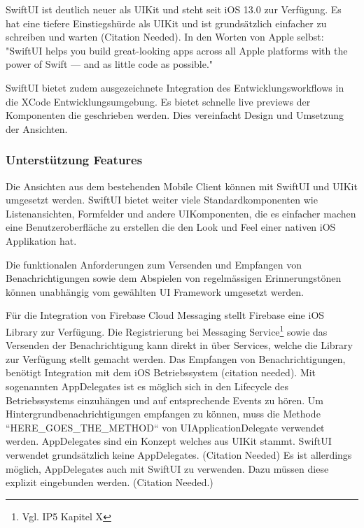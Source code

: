 SwiftUI ist deutlich neuer als UIKit und steht seit iOS 13.0 zur Verfügung.
Es hat eine tiefere Einstiegshürde als UIKit und ist grundsätzlich einfacher zu schreiben und warten (Citation Needed).
In den Worten von Apple selbst: "SwiftUI helps you build great-looking apps across all Apple platforms with the power of Swift — and as little code as possible."\cite{ios_swift_ui}

SwiftUI bietet zudem ausgezeichnete Integration des Entwicklungsworkflows in die XCode Entwicklungsumgebung.
Es bietet schnelle live previews der Komponenten die geschrieben werden.
Dies vereinfacht Design und Umsetzung der Ansichten.

\clearpage


\subsubsection*{Unterstützung Features}

Die Ansichten aus dem bestehenden Mobile Client können mit SwiftUI und UIKit umgesetzt werden.
SwiftUI bietet weiter viele Standardkomponenten wie Listenansichten, Formfelder und andere UIKomponenten,
die es einfacher machen eine Benutzeroberfläche zu erstellen die den Look und Feel einer nativen iOS Applikation hat.

Die funktionalen Anforderungen zum Versenden und Empfangen von Benachrichtigungen sowie
dem Abspielen von regelmässigen Erinnerungstönen können unabhängig vom gewählten UI Framework umgesetzt werden.

Für die Integration von Firebase Cloud Messaging stellt Firebase eine iOS Library zur Verfügung.\cite{firebase_github_ios}
Die Registrierung bei Messaging Service\footnote{Vgl. IP5 Kapitel X} sowie das Versenden der Benachrichtigung kann direkt in über Services,
welche die Library zur Verfügung stellt gemacht werden.
Das Empfangen von Benachrichtigungen, benötigt Integration mit dem iOS Betriebssystem (citation needed).
Mit sogenannten AppDelegates\cite{ios_app_delegate} ist es möglich sich in den Lifecycle des Betriebssystems einzuhängen
und auf entsprechende Events zu hören.
Um Hintergrundbenachrichtigungen empfangen zu können, muss die Methode ``HERE_GOES_THE_METHOD`` von UIApplicationDelegate verwendet werden.
AppDelegates sind ein Konzept welches aus UIKit stammt.
SwiftUI verwendet grundsätzlich keine AppDelegates. (Citation Needed)
Es ist allerdings möglich, AppDelegates auch mit SwiftUI zu verwenden.
Dazu müssen diese explizit eingebunden werden. (Citation Needed.)

